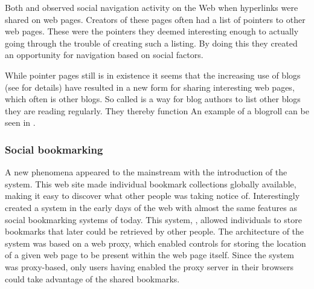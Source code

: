 
Both \cite{dourish94} and \cite{dieberger97} observed social navigation
activity on the Web when hyperlinks were shared on web pages.
Creators of these pages often had a list of pointers to other web pages.
These were the pointers they deemed interesting enough to actually going
through the trouble of creating such a listing. By doing this they created
an opportunity for navigation based on social factors.

While pointer pages still is in existence it seems that the increasing
use of blogs (see  for details)
have resulted in a new form for sharing interesting web pages,
which often is other blogs. So called  is a way for blog
authors to list other blogs they are reading regularly. They thereby function
An example of a blogroll can be seen in .

\subsubsection{Social bookmarking}

A new phenomena appeared to the mainstream with the introduction of the
 system. This web site made individual
bookmark collections globally available, making it easy to discover what other
people was taking notice of. Interestingly \citet{keller97} created a system
in the early days of the web with almost the same features as social
bookmarking systems of today. This system, , allowed
individuals to store bookmarks that later could be retrieved by other people.
The architecture of the system was based on a web proxy, which enabled
controls for storing the location of a given web page to be present within the
web page itself. Since the system was proxy-based, only users having enabled
the proxy server in their browsers could take advantage of the shared
bookmarks.

